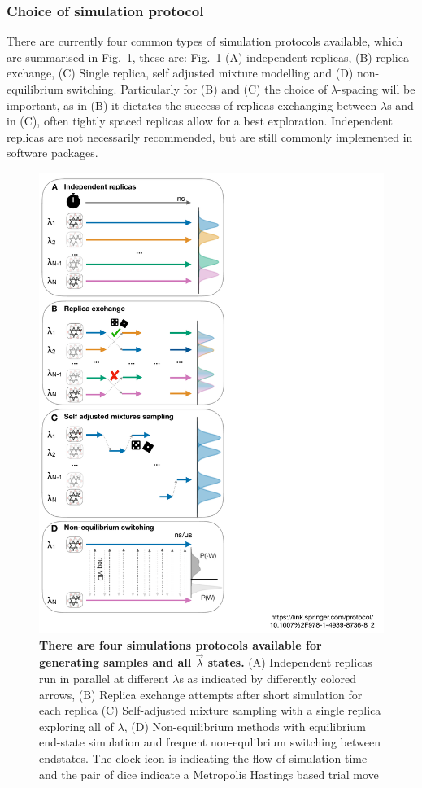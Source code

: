 \documentclass[9pt,bestpractices]{livecoms}
\begin{document}
\subsubsection{Choice of simulation protocol}
There are currently four common types of simulation protocols available, which are summarised in Fig.~\ref{fig:protocols}, these are: Fig.~\ref{fig:protocols} (A) independent replicas, (B) replica exchange, (C) Single replica, self adjusted mixture modelling and (D) non-equilibrium switching. Particularly for (B) and (C) the choice of $\lambda$-spacing will be important, as in (B) it dictates the success of replicas exchanging between $\lambda$s and in (C), often tightly spaced replicas allow for a best exploration. Independent replicas are not necessarily recommended, but are still commonly implemented in software packages. 
\begin{figure}
    \includegraphics[width=0.95\linewidth]{figures/setup/protocol/Figure.pdf}
    \caption{\textbf{There are four simulations protocols available for generating samples and all $\vec{\lambda}$ states.} (A) Independent replicas run in parallel at different $\lambda$s as indicated by differently colored arrows, (B) Replica exchange attempts after short simulation for each replica (C) Self-adjusted mixture sampling with a single replica exploring all of $\lambda$, (D) Non-equilibrium methods with equilibrium end-state simulation and frequent non-equlibrium switching between endstates. The clock icon is indicating the flow of simulation time and the pair of dice indicate a Metropolis Hastings based trial move}
    \label{fig:protocols}
\end{figure}
\end{document}
